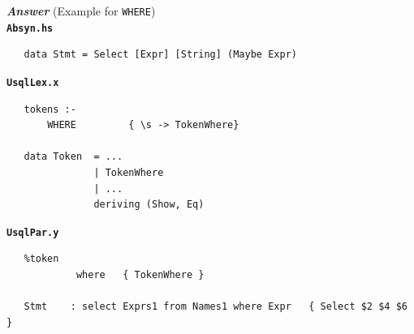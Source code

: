 \documentclass[a4paper]{article}
\begin{document}
\begin{exercise}
\noindent
\textbf{\emph{Answer}} (Example for \texttt{WHERE}) \\

\noindent
\texttt{\textbf{Absyn.hs}}
{\codesetup\begin{verbatim}
   data Stmt = Select [Expr] [String] (Maybe Expr) 
\end{verbatim}}

\noindent
\texttt{\textbf{UsqlLex.x}}
{\codesetup\begin{verbatim}
   tokens :-
       WHERE         { \s -> TokenWhere}
   
   data Token  = ... 
               | TokenWhere
               | ...
               deriving (Show, Eq)
\end{verbatim}}



\noindent
\texttt{\textbf{UsqlPar.y}}
{\codesetup\begin{verbatim}
   %token  
            where   { TokenWhere }
       
   Stmt    : select Exprs1 from Names1 where Expr   { Select $2 $4 $6 }
\end{verbatim}}


\end{exercise}
\end{document}

